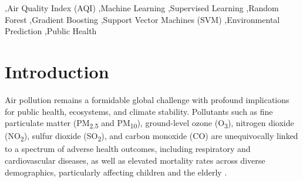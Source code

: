 \documentclass[a4paper,fleqn]{cas-dc}
\begin{document}

\begin{abstract}
Air pollution has become one of the most critical environmental issues affecting human health, climate, and sustainable development. The Air Quality Index (AQI) is a standardized measure used to represent air quality levels and their associated health impacts. Accurate prediction of AQI categories is essential for timely decision-making and effective pollution management. In this study, machine learning techniques are employed to predict AQI categories based on historical air quality data consisting of pollutants such as PM2.5, PM10, NO\textsubscript{2}, SO\textsubscript{2}, CO, and O\textsubscript{3}. Various supervised learning algorithms, including Decision Trees, Random Forest, Support Vector Machines (SVM), and Gradient Boosting, are trained and evaluated on benchmark datasets. Performance is assessed using accuracy, precision, recall, and F1-score metrics. The experimental results demonstrate that ensemble-based models, particularly Random Forest and Gradient Boosting, achieve superior predictive performance compared to traditional classifiers. This research highlights the potential of machine learning in developing intelligent AQI prediction systems, which can support environmental agencies and policymakers in mitigating air pollution risks and improving public health awareness.
\end{abstract}





\begin{keywords}
\sep Air Quality Index (AQI) 
\sep Machine Learning 
\sep Supervised Learning 
\sep Random Forest 
\sep Gradient Boosting 
\sep Support Vector Machines (SVM) 
\sep Environmental Prediction 
\sep Public Health
\end{keywords}


\maketitle


\section{Introduction}
\label{sec:introduction}

Air pollution remains a formidable global challenge with profound implications for public health, ecosystems, and climate stability. Pollutants such as fine particulate matter (PM\textsubscript{2.5} and PM\textsubscript{10}), ground-level ozone (O\textsubscript{3}), nitrogen dioxide (NO\textsubscript{2}), sulfur dioxide (SO\textsubscript{2}), and carbon monoxide (CO) are unequivocally linked to a spectrum of adverse health outcomes, including respiratory and cardiovascular diseases, as well as elevated mortality rates across diverse demographics, particularly affecting children and the elderly \cite{who_report_2021}.
\end{document}
